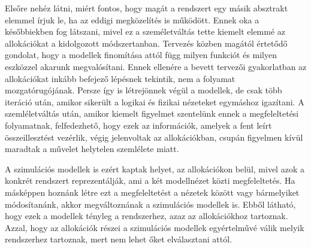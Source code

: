         Elsőre nehéz látni, miért fontos, hogy magát a rendszert egy másik absztrakt elemmel írjuk le, ha az eddigi megközelítés is működött. Ennek oka a későbbiekben fog látszani, mivel ez a személetváltás tette kiemelt elemmé az allokációkat a kidolgozott módszertanban.
        Tervezés közben magától értetődő gondolat, hogy a modellek finomítása attól függ milyen funkciót és milyen eszközzel akarunk megvalósítani.
        Ennek ellenére a bevett tervezői gyakorlatban az allokációkat inkább befejező lépésnek tekintik, nem a folyamat mozgatórugójának. Persze így is létrejönnek végül a modellek, de csak több iteráció után, amikor sikerült a logikai és fizikai nézeteket egymáshoz igazítani.
        A szemléletváltás után, amikor kiemelt figyelmet szentelünk ennek a megfeleltetési folyamatnak, felfedezhető, hogy ezek az információk, amelyek a fent leírt összeillesztést vezérlik, végig jelenvoltak az allokációkban, csupán figyelmen kívül maradtak a művelet helytelen szemlélete miatt.

        A szimulációs modellek is ezért kaptak helyet, az allokációkon belül, mivel azok a konkrét rendszert reprezentálják, ami a két modellnézet közti megfeleltetés.
        Ha másképpen hoznánk létre ezt a megfeleltetést a nézetek között vagy bármelyiket módosítanánk, akkor megváltoznának a szimulációs modellek is. Ebből látható, hogy ezek a modellek tényleg a rendszerhez, azaz az allokációkhoz tartoznak. Azzal, hogy az allokációk részei a szimulációs modellek egyértelművé válik melyik rendszerhez tartoznak, mert nem lehet őket elválasztani attól.

